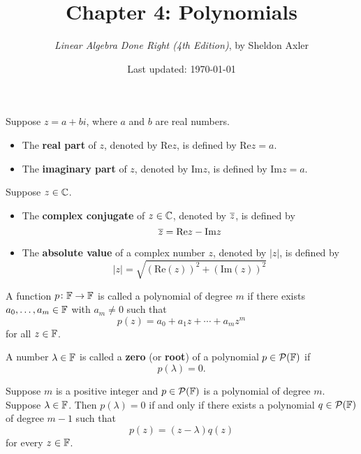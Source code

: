 \documentclass{extarticle}
\title{\vspace{-2em}Chapter 4: Polynomials}
\author{\emph{Linear Algebra Done Right (4th Edition)}, by Sheldon Axler}
\date{Last updated: \today}
\begin{document}
\maketitle 

\begin{definition}[Re z, Im z]
    Suppose \(z = a + b i\), where \(a\) and \(b\) are real numbers. 
    \begin{itemize}
        \item The \textbf{real part} of \(z\), denoted by Re\(z\), is defined by Re\(z=a\).
        \item The \textbf{imaginary part} of \(z\), denoted by Im\(z\), is defined by Im\(z=a\).
    \end{itemize}
\end{definition}

\begin{definition}
    Suppose \(z \in \mathbb{C}\). 
    \begin{itemize}
        \item The \textbf{complex conjugate} of \(z \in \mathbb{C}\), denoted by \(\overline{z}\), is defined by 
        \[\overline{z} = \text{Re}z - \text{Im}z\]
        \item The \textbf{absolute value} of a complex number \(z\), denoted by \(|z|\), is defined by 
        \[|z| = \sqrt{(\text{Re}(z))^2 + (\text{Im}(z))^2}\]
    \end{itemize}
\end{definition}

A function \(p \colon \mathbb{F} \to \mathbb{F}\) is called a polynomial of degree \(m\) if there exists 
\(a_0, \ldots, a_m \in \mathbb{F}\) with \(a_m \neq 0\) such that 
\[p(z) = a_0 + a_1z + \cdots + a_m z^m\]
for all \(z \in \mathbb{F}\). 

\begin{definition}
    A number \(\lambda \in \mathbb{F}\) is called a \textbf{zero} (or \textbf{root}) of a polynomial 
    \(p \in\mathcal{P}(\mathbb{F})\) if 
    \[p(\lambda) = 0.\]
\end{definition}

\begin{lemma}
    Suppose \(m\) is a positive integer and \(p \in \mathcal{P}(\mathbb{F})\) is a polynomial of degree \(m\). 
    Suppose \(\lambda \in \mathbb{F}\). Then \(p(\lambda) = 0\) if and only if there exists a polynomial 
    \(q \in \mathcal{P}(\mathbb{F})\) of degree \(m - 1\) such that 
    \[p(z) = (z - \lambda)q(z)\]
    for every \(z \in \mathbb{F}\). 
\end{lemma}
\end{document}
